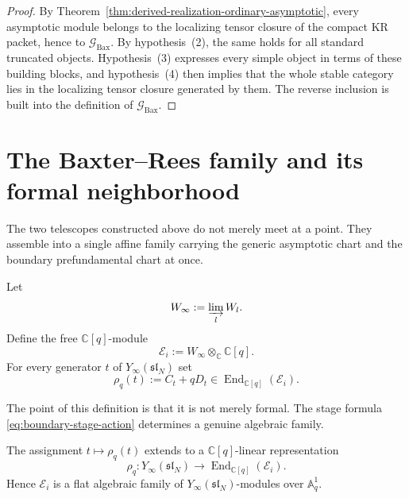 \begin{proof}
By Theorem~\ref{thm:derived-realization-ordinary-asymptotic}, every
asymptotic module belongs to the localizing tensor closure of the compact
KR packet, hence to $\mathcal G_{\mathrm{Bax}}$. By hypothesis~(2), the
same holds for all standard truncated objects. Hypothesis~(3) expresses
every simple object in terms of these building blocks, and
hypothesis~(4) then implies that the whole stable category lies in the
localizing tensor closure generated by them. The reverse inclusion is
built into the definition of $\mathcal G_{\mathrm{Bax}}$.
\end{proof}

\section{The Baxter--Rees family and its formal neighborhood}
\label{sec:typeA-baxter-rees-family}

The two telescopes constructed above do not merely meet at a point. They
assemble into a single affine family carrying the generic asymptotic chart
and the boundary prefundamental chart at once.

\begin{definition}
\label{def:baxter-rees-family}
Let
\begin{equation}
W_\infty:=\varinjlim_l W_l.
\end{equation}
Define the free $\mathbb C[q]$-module
\begin{equation}
\mathcal E_i:=W_\infty\otimes_{\mathbb C}\mathbb C[q].
\end{equation}
For every generator $t$ of $Y_\infty(\mathfrak{sl}_N)$ set
\begin{equation}
\rho_q(t):=C_t+qD_t\in \operatorname{End}_{\mathbb C[q]}(\mathcal E_i).
\end{equation}
\end{definition}

The point of this definition is that it is not merely formal. The stage
formula \eqref{eq:boundary-stage-action} determines a genuine algebraic
family.

\begin{theorem}
\ClaimStatusProvedHere
\label{thm:algebraicity-baxter-rees-family}
The assignment $t\mapsto \rho_q(t)$ extends to a
$\mathbb C[q]$-linear representation
\begin{equation}
\rho_q:Y_\infty(\mathfrak{sl}_N)
\longrightarrow
\operatorname{End}_{\mathbb C[q]}(\mathcal E_i).
\end{equation}
Hence $\mathcal E_i$ is a flat algebraic family of
$Y_\infty(\mathfrak{sl}_N)$-modules over $\mathbb A^1_q$.
\end{theorem}

